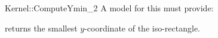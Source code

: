 \begin{ccRefFunctionObjectConcept}{Kernel::ComputeYmin_2}
A model for this must provide:


       {returns the smallest $y$-coordinate of the iso-rectangle.}


\ccRefines
{}



\end{ccRefFunctionObjectConcept}
